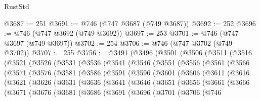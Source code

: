 \begin{lexlean}{RustStd}
\begin{coremodule}
@3687 := 251
@3691 := @746 (@747 @3687 (@749 @3687))
@3692 := 252
@3696 := @746 (@747 @3692 (@749 @3692))
@3697 := 253
@3701 := @746 (@747 @3697 (@749 @3697))
@3702 := 254
@3706 := @746 (@747 @3702 (@749 @3702))
@3707 := 255
@3756 := @3491
    (@3496
      (@3501
        (@3506
          (@3511
            (@3516
              (@3521
                (@3526
                  (@3531
                    (@3536
                      (@3541
                        (@3546
                          (@3551
                            (@3556
                              (@3561
                                (@3566
                                  (@3571
                                    (@3576
                                      (@3581
                                        (@3586
                                          (@3591
                                            (@3596
                                              (@3601
                                                (@3606
                                                  (@3611
                                                    (@3616
                                                      (@3621
                                                        (@3626
                                                          (@3631
                                                            (@3636
                                                              (@3641
                                                                (@3646
                                                                  (@3651
                                                                    (@3656
                                                                      (@3661
                                                                        (@3666
                                                                          (@3671
                                                                            (@3676
                                                                              (@3681
                                                                                (@3686
                                                                                  (@3691
                                                                                    (@3696
                                                                                      (@3701
                                                                                        (@3706
                                                                                          (@746

\end{coremodule}
\end{lexlean}
